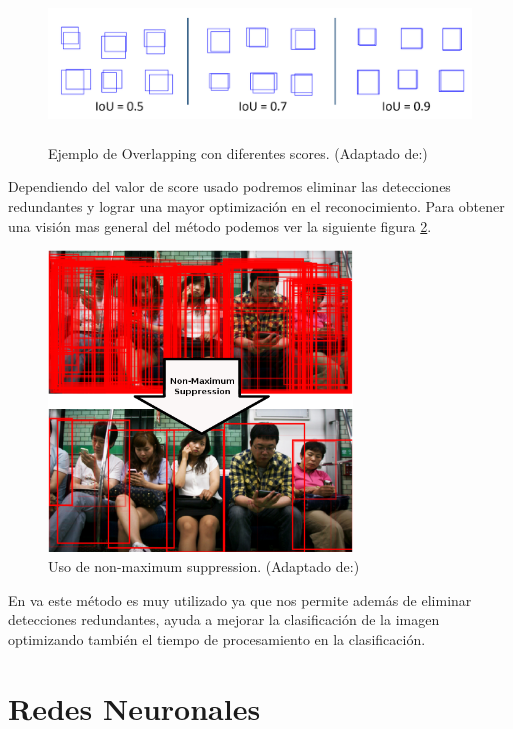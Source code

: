 \begin{figure}[h]
 \centering
  \includegraphics[height=4cm,keepaspectratio=true,clip=true]{imagenes/Logos/overlapping.png}
  \caption{Ejemplo de Overlapping con diferentes scores. (Adaptado de:\citep{edges})}
	\label{Fig: interseccion}
\end{figure}
Dependiendo del valor de score usado podremos eliminar las detecciones redundantes y lograr una mayor optimización  en el reconocimiento. Para obtener una visión mas general del método podemos ver la siguiente figura \ref{Fig: nonmaximumsuppression}.



\begin{figure}[H]
 \centering
  \includegraphics[height=8cm,keepaspectratio=true,clip=true]{imagenes/Logos/nms.png}
  \caption{Uso de non-maximum suppression. (Adaptado de:\citep{nms2})}
	\label{Fig: nonmaximumsuppression}
\end{figure}

En \ac{va} este método es muy utilizado ya que nos permite además de eliminar detecciones redundantes, ayuda a mejorar la clasificación de la imagen optimizando también el tiempo de procesamiento en la clasificación.



\section{Redes Neuronales}\label{sec:redesneuronales}

